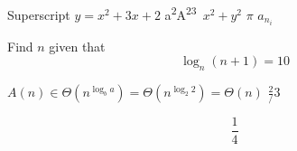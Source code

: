 \documentclass[11pt]{article}
\begin{document}
Superscript $y=x^2+3x+2$
a\textsuperscript{2}A\textsuperscript{23}\
$x^2 + y^2 $
$\pi$
$a_{n_i}$


Find $n$ given that
\[
 \log_{n} (n+1)=10
\]


$A(n) \in \Theta(n^{\log_b a}) = \Theta(n^{\log_2 2} ) = \Theta(n)$
$\frac{2}/{3}$

\begin{equation}
\frac{1}{4}
\end{equation}
\end{document}
